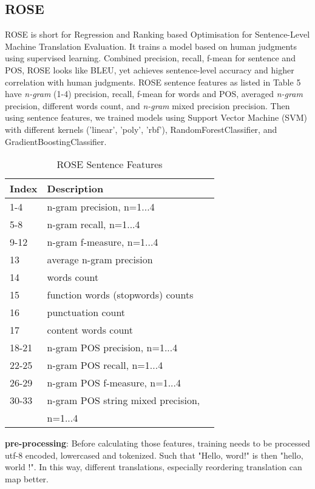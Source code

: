 \documentclass[11pt]{article}
\begin{document}
\subsection{ROSE}
ROSE is short for Regression and Ranking based Optimisation for Sentence-Level Machine Translation Evaluation. It trains a model based on human judgments using supervised learning. Combined precision, recall, f-mean for sentence and POS, ROSE looks like BLEU, yet achieves sentence-level accuracy and higher correlation with human judgments. ROSE sentence features as listed in Table 5 \cite{WMT:11} have \emph{n-gram} (1-4) precision, recall, f-mean for words and POS, averaged \emph{n-gram} precision, different words count, and \emph{n-gram} mixed precision precision. Then using sentence features, we trained models using Support Vector Machine (SVM) with different kernels ('linear', 'poly', 'rbf'), RandomForestClassifier, and GradientBoostingClassifier.

\begin{table}[h]
\begin{center}
\begin{tabular}{|l|ll|}
\hline
\bf Index & \bf Description & \\
\hline
1-4 & n-gram precision, n=1...4 & \\
5-8 & n-gram recall, n=1...4 & \\
9-12 & n-gram f-measure, n=1...4 & \\
13 & average n-gram precision & \\
14 & words count & \\
15 & function words (stopwords) counts  & \\
16 & punctuation count & \\
17 & content words count & \\
\hline
18-21 & n-gram POS precision, n=1...4 & \\
22-25 & n-gram POS recall, n=1...4 & \\
26-29 & n-gram POS f-measure, n=1...4 & \\
30-33 & n-gram POS string mixed precision, & \\
      & n=1...4 & \\
\hline
\end{tabular}
\end{center}
\caption{\label{tab:rose-sf} ROSE Sentence Features }
\end{table}

{\bf pre-processing}: Before calculating those features, training needs to be processed utf-8 encoded, lowercased and tokenized. Such that "Hello, word!" is then "hello, world !". In this way, different translations, especially reordering translation can map better.
\end{document}

